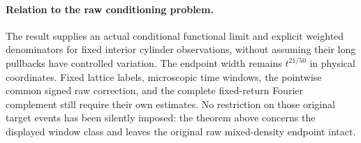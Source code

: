 \paragraph{Relation to the raw conditioning problem.}
The result supplies an actual conditional functional limit and explicit
weighted denominators for fixed interior cylinder observations, without
assuming their long pullbacks have controlled variation. The endpoint
width remains $t^{21/50}$ in physical coordinates. Fixed lattice labels,
microscopic time windows, the pointwise common signed raw correction,
and the complete fixed-return Fourier complement still require their
own estimates. No restriction on those original target events has been
silently imposed: the theorem above concerns the displayed window class
and leaves the original raw mixed-density endpoint intact.
